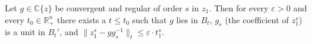 Let $g \in \mathbb{C}\{z\}$ be convergent and regular of order $s$ in $z_1$. Then for every $\varepsilon > 0$ and every $t_0 \in \mathbb{R}_+^n$ there exists a $t \leqslant t_0$ such that $g$ lies in $B_t$, $g_s$ (the coefficient of $z_1^s$) is a unit in $B_t'$, and $\|z_1^s - g g_s^{-1}\|_t \leqslant \varepsilon \cdot t_1^s$.
